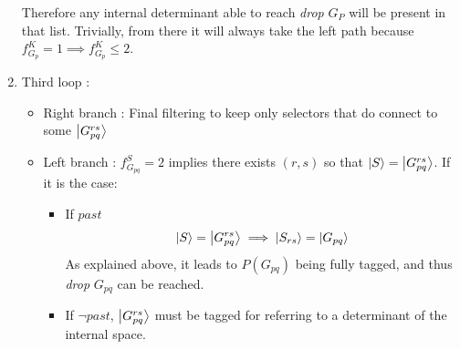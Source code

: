 \documentclass[./thesis.tex]{subfiles}
\begin{document}
\begin{enumerate}
Therefore any internal determinant able to reach \emph{drop} $G_P$ will be present in that list. Trivially, from there it will always take the left path because $f^K_{G_{p}} = 1 \implies f^K_{G_{p}} \leq 2$.


\item
Third loop :
\begin{itemize}

\item
Right branch :
Final filtering to keep only selectors that do connect to some $\ket{G^{rs}_{pq}}$
\item
Left branch : $f_{G_{pq}}^S = 2$ implies there exists $(r,s)$ so that $\ket S=\ket{G^{rs}_{pq}}$. If it is the case:
\begin{itemize}
\item
If $past$
\begin{equation}
\ket S=\ket {G_{pq}^{rs}} \implies \ket {S_{rs}} = \ket {G_{pq}}
\end{equation}
As explained above, it leads to $P(G_{pq})$ being fully tagged, and thus \emph{drop} $G_{pq}$ can be reached.
\item
If $\neg past$, $\ket {G_{pq}^{rs}}$ must be tagged for referring to a determinant of the internal space.
\end{itemize}



\end{itemize}

\end{enumerate}



\newcommand{\Gpq}{\ket {G_{pq}}}
\newcommand{\Gpbq}{\ket {G_{p \bar q}}}
\end{document}
